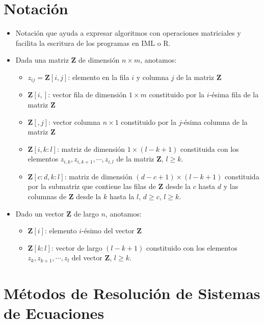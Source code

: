 \documentclass[openany]{book}
\providecommand{\tightlist}{%
  \setlength{\itemsep}{0pt}\setlength{\parskip}{0pt}}
\begin{document}
\hypertarget{notaciuxf3n}{%
\section{Notación}\label{notaciuxf3n}}

\begin{itemize}
\item
  Notación que ayuda a expresar algoritmos con operaciones matriciales y facilita la escritura de los programas en IML o R.
\item
  Dada una matriz \(\mathbf{Z}\) de dimensión \(n \times m\), anotamos:

  \begin{itemize}
  \tightlist
  \item
    \(z_{ij} = \mathbf{Z}[i, j]\): elemento en la fila \(i\) y columna \(j\) de la matriz \(\mathbf{Z}\)
  \item
    \(\mathbf{Z}[i,]\): vector fila de dimensión \(1\times m\) constituido por la \(i\)-ésima fila de la matriz \(\mathbf{Z}\)
  \item
    \(\mathbf{Z}[,j]\): vector columna \(n\times 1\) constituido por la \(j\)-ésima columna de la matriz \(\mathbf{Z}\)
  \item
    \(\mathbf{Z}[i,k:l]\): matriz de dimensión \(1\times (l-k+1)\) constituida con los elementos \(z_{i,k}, z_{i,k+1}, \cdots, z_{i,l}\) de la matriz \(\mathbf{Z}\), \(l \geq k\).
  \item
    \(\mathbf{Z}[c:d,k:l]\): matriz de dimensión \((d-c+1)\times (l-k+1)\) constituida por la submatriz que contiene las filas de \(\mathbf{Z}\) desde la \(c\) hasta \(d\) y las columnas de \(\mathbf{Z}\) desde la \(k\) hasta la \(l\), \(d \geq c\), \(l \geq k\).
  \end{itemize}
\item
  Dado un vector \(\mathbf{Z}\) de largo \(n\), anotamos:

  \begin{itemize}
  \tightlist
  \item
    \(\mathbf{Z}[i]\): elemento \(i\)-ésimo del vector \(\mathbf{Z}\)
  \item
    \(\mathbf{Z}[k:l]\): vector de largo \((l-k+1)\) constituido con los elementos \(z_{k}, z_{k+1}, \cdots, z_{l}\) del vector \(\mathbf{Z}\), \(l \geq k\).
  \end{itemize}
\end{itemize}

\hypertarget{muxe9todos-de-resoluciuxf3n-de-sistemas-de-ecuaciones}{%
\section{Métodos de Resolución de Sistemas de Ecuaciones}\label{muxe9todos-de-resoluciuxf3n-de-sistemas-de-ecuaciones}}
\end{document}
